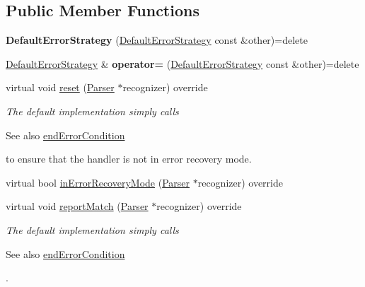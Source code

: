 \subsection*{Public Member Functions}
\begin{DoxyCompactItemize}
\item 
\mbox{\label{classantlr4_1_1DefaultErrorStrategy_ae33bdf3cec035b4232bc7b00cccdb76a}} 
{\bfseries Default\+Error\+Strategy} (\hyperlink{classantlr4_1_1DefaultErrorStrategy}{Default\+Error\+Strategy} const \&other)=delete
\item 
\mbox{\label{classantlr4_1_1DefaultErrorStrategy_ae0a3e0ea5418c980a92a471e26ecfb59}} 
\hyperlink{classantlr4_1_1DefaultErrorStrategy}{Default\+Error\+Strategy} \& {\bfseries operator=} (\hyperlink{classantlr4_1_1DefaultErrorStrategy}{Default\+Error\+Strategy} const \&other)=delete
\item 
virtual void \hyperlink{classantlr4_1_1DefaultErrorStrategy_a09526cdda0619309a8063dbfe8138c2d}{reset} (\hyperlink{classantlr4_1_1Parser}{Parser} $\ast$recognizer) override
\begin{DoxyCompactList}\small\item\em The default implementation simply calls \begin{DoxySeeAlso}{See also}
\hyperlink{classantlr4_1_1DefaultErrorStrategy_ae04080b08ef36ab9586fe2273ce960f0}{end\+Error\+Condition}


\end{DoxySeeAlso}
to ensure that the handler is not in error recovery mode. \end{DoxyCompactList}\item 
virtual bool \hyperlink{classantlr4_1_1DefaultErrorStrategy_a354b6e4152a68a2b7d9c1357a49ec3cc}{in\+Error\+Recovery\+Mode} (\hyperlink{classantlr4_1_1Parser}{Parser} $\ast$recognizer) override
\item 
virtual void \hyperlink{classantlr4_1_1DefaultErrorStrategy_a9ec4d98c54d479e46909579fb3460300}{report\+Match} (\hyperlink{classantlr4_1_1Parser}{Parser} $\ast$recognizer) override
\begin{DoxyCompactList}\small\item\em The default implementation simply calls \begin{DoxySeeAlso}{See also}
\hyperlink{classantlr4_1_1DefaultErrorStrategy_ae04080b08ef36ab9586fe2273ce960f0}{end\+Error\+Condition}


\end{DoxySeeAlso}
. \end{DoxyCompactList}\end{DoxyCompactItemize}
